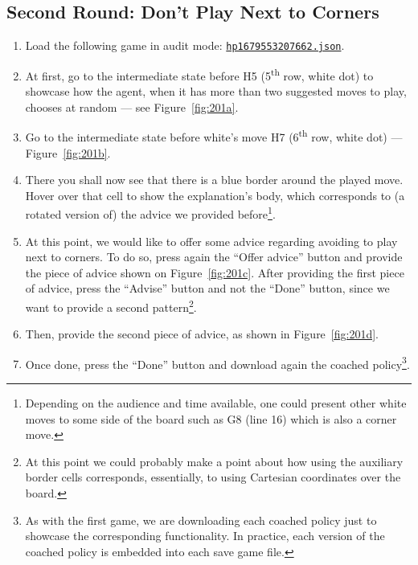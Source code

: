 \documentclass[a4paper,11pt]{article}
\theoremstyle{definition}
\theoremstyle{remark}
\numberwithin{equation}{section}
\begin{document}
	\subsection{Second Round: Don't Play Next to Corners}\label{subsec:Round Two}
	\begin{enumerate}
		\item Load the following game in audit mode: \href{../games/hp_50_14_1679553207662.json}{\texttt{hp\textunderscore 1679553207662.json}}.
		\item At first, go to the intermediate state before H5 (5\textsuperscript{th} row, white dot) to showcase how the agent, when it has more than two suggested moves to play, chooses at random --- see Figure~\ref{fig:201a}.
		\item Go to the intermediate state before white's move H7 (6\textsuperscript{th} row, white dot) --- Figure~\ref{fig:201b}.
		\item There you shall now see that there is a blue border around the played move. Hover over that cell to show the explanation's body, which corresponds to (a rotated version of) the advice we provided before\footnote{Depending on the audience and time available, one could present other white moves to some side of the board such as G8 (line 16) which is also a corner move.}.
		\item At this point, we would like to offer some advice regarding avoiding to play next to corners. To do so, press again the ``Offer advice'' button and provide the piece of advice shown on Figure~\ref{fig:201c}. After providing the first piece of advice, press the ``Advise'' button and not the ``Done'' button, since we want to provide a second pattern\footnote{At this point we could probably make a point about how using the auxiliary border cells corresponds, essentially, to using Cartesian coordinates over the board.}.
		\item Then, provide the second piece of advice, as shown in Figure~\ref{fig:201d}.
		\item Once done, press the ``Done'' button and download again the coached policy\footnote{As with the first game, we are downloading each coached policy just to showcase the corresponding functionality. In practice, each version of the coached policy is embedded into each save game file.}.
	\end{enumerate}
\end{document}
